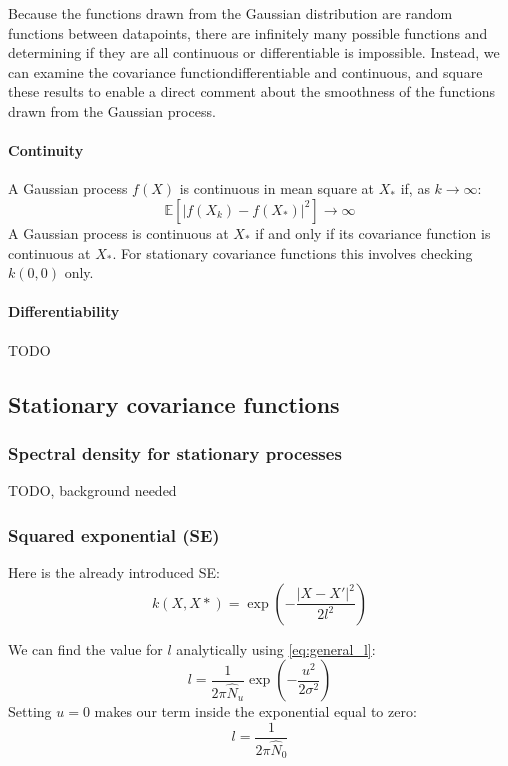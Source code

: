 Because the functions drawn from the Gaussian distribution are random functions between datapoints, there are infinitely many possible functions and determining if they are all continuous or differentiable is impossible. Instead, we can examine the covariance functiondifferentiable and continuous, and square these results to enable a direct comment about the smoothness of the functions drawn from the Gaussian process.

\paragraph{Continuity}
A Gaussian process $f(X)$ is continuous in mean square at $X_*$ if, as $k \to \infty$:
\begin{equation*}
    \mathbb{E}[|f(X_k) - f(X_*)|^2] \to \infty
\end{equation*}
A Gaussian process is continuous at $X_*$ if and only if its covariance function is continuous at $X_*$. For stationary covariance functions this involves checking $k(0, 0)$ only.

\paragraph{Differentiability}
TODO

\subsection{Stationary covariance functions \cite{gp-ml}}

\subsubsection{Spectral density for stationary processes}
TODO, background needed

\subsubsection{Squared exponential (SE)}
Here is the already introduced SE:
\begin{equation*}
    k(X,X*) = \exp \left(- \frac{|X - X'|^2}{2l^2} \right)
\end{equation*}

We can find the value for $l$ analytically using \ref{eq:general_l}:
\begin{equation*}
    l = \frac{1}{2\pi\hat{N}_u} \exp\left(-\frac{u^2}{2\sigma^2}\right)
\end{equation*}
Setting $u = 0$ makes our term inside the exponential equal to zero:
\begin{equation*}
    l = \frac{1}{2\pi\hat{N}_0}
\end{equation*}

